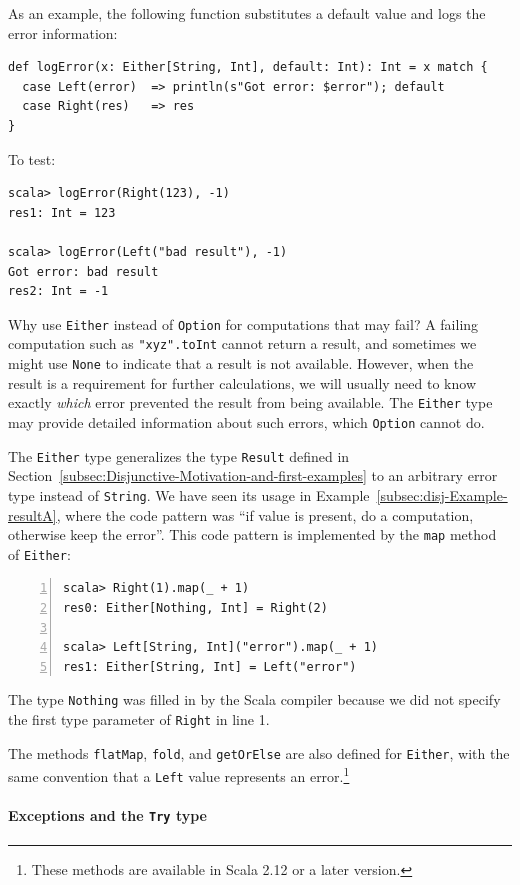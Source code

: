 As an example, the following function substitutes a default value
and logs the error information:
\begin{lstlisting}
def logError(x: Either[String, Int], default: Int): Int = x match {
  case Left(error)  => println(s"Got error: $error"); default
  case Right(res)   => res
}
\end{lstlisting}
To test:
\begin{lstlisting}
scala> logError(Right(123), -1)
res1: Int = 123

scala> logError(Left("bad result"), -1)
Got error: bad result
res2: Int = -1
\end{lstlisting}

Why use \lstinline!Either! instead of \lstinline!Option! for computations
that may fail? A failing computation such as \lstinline!"xyz".toInt!
cannot return a result, and sometimes we might use \lstinline!None!
to indicate that a result is not available. However, when the result
is a requirement for further calculations, we will usually need to
know exactly \emph{which} error prevented the result from being available.
The \lstinline!Either! type may provide detailed information about
such errors, which \lstinline!Option! cannot do. 

The \lstinline!Either! type generalizes the type \lstinline!Result!
defined in Section~\ref{subsec:Disjunctive-Motivation-and-first-examples}
to an arbitrary error type instead of \lstinline!String!. We have
seen its usage in Example~\ref{subsec:disj-Example-resultA}, where
the code pattern was \textsf{``}if value is present, do a computation, otherwise
keep the error\textsf{''}. This code pattern is implemented by the \lstinline!map!
method of \lstinline!Either!:
\begin{lstlisting}[numbers=left]
scala> Right(1).map(_ + 1)
res0: Either[Nothing, Int] = Right(2)

scala> Left[String, Int]("error").map(_ + 1)
res1: Either[String, Int] = Left("error")
\end{lstlisting}
The type \lstinline!Nothing! was filled in by the Scala compiler
because we did not specify the first type parameter of \lstinline!Right!
in line 1.

The methods \lstinline!flatMap!, \lstinline!fold!, and \lstinline!getOrElse!
are also defined for \lstinline!Either!, with the same convention
that a \lstinline!Left! value represents an error.\footnote{These methods are available in Scala 2.12 or a later version.}

\paragraph{Exceptions and the \texttt{Try} type}

